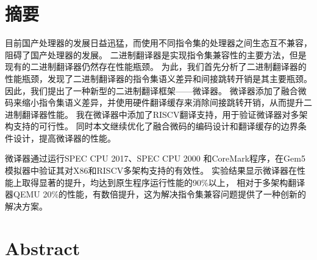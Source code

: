 \maketitle%
\MAKETITLE%
\makedeclaration%
\intobmk\chapter*{摘\quad 要}%
\setcounter{page}{1}%

目前国产处理器的发展日益迅猛，而使用不同指令集的处理器之间生态互不兼容，阻碍了国产处理器的发展。
二进制翻译器是实现指令集兼容性的主要方法，但是现有的二进制翻译器仍然存在性能瓶颈。
为此，我们首先分析了二进制翻译器的性能瓶颈，发现了二进制翻译器的指令集语义差异和间接跳转开销是其主要瓶颈。
因此，我们提出了一种新型的二进制翻译框架——微译器。
微译器添加了融合微码来缩小指令集语义差异，并使用硬件翻译缓存来消除间接跳转开销，从而提升二进制翻译器性能。
我在微译器中添加了RISCV翻译支持，用于验证微译器对多架构支持的可行性。
同时本文继续优化了融合微码的编码设计和翻译缓存的边界条件设计，提高微译器的性能。

微译器通过运行SPEC CPU 2017、SPEC CPU 2000 和CoreMark程序，在Gem5模拟器中验证其对X86和RISCV多架构支持的有效性。
实验结果显示微译器在性能上取得显著的提升，均达到原生程序运行性能的90\%以上，
相对于多架构翻译器QEMU 20\%的性能，有数倍提升，这为解决指令集兼容问题提供了一种创新的解决方案。

\intobmk\chapter*{Abstract}%


